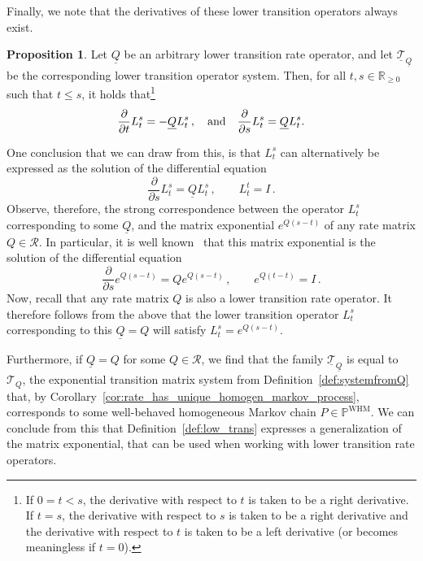 \documentclass[10pt,a4paper]{paper}
\theoremstyle{definition}
\newtheorem{proposition}[theorem]{Proposition}
\newcommand{\reals}{\mathbb{R}}
\newcommand{\realsnonneg}{\reals_{\geq 0}}
\newcommand{\processes}{\mathbb{P}}
\newcommand{\whmprocesses}{\processes^{\mathrm{WHM}}}
\newcommand{\lbound}{L}
\newcommand{\lrate}{\underline{Q}}
\begin{document}
Finally, we note that the derivatives of these lower transition operators always exist.

\begin{proposition}\label{prop:lower_transition_has_deriv}
Let $\lrate$ be an arbitrary lower transition rate operator, and let $\underline{\mathcal{T}}_{\lrate}$ be the corresponding lower transition operator system. Then, for all $t,s\in\realsnonneg$ such that $t\leq s$, it holds that\footnote{If $0=t<s$, the derivative with respect to $t$ is taken to be a right derivative. If $t=s$, the derivative with respect to $s$ is taken to be a right derivative and the derivative with respect to $t$ is taken to be a left derivative (or becomes meaningless if $t=0$).}
\begin{equation*}
\frac{\partial}{\partial t}\lbound_t^s=-\lrate\lbound_t^s\,,\quad\text{and}\quad\frac{\partial}{\partial s}\lbound_t^s=\lrate\lbound_t^s.\vspace{7pt}
\end{equation*}
\end{proposition}

One conclusion that we can draw from this, is that $L_t^s$ can alternatively be expressed as the solution of the differential equation
\begin{equation*}
\frac{\partial}{\partial s}L_t^s=\lrate L_t^s\,,\quad\quad L_t^t=I\,.
\end{equation*}
Observe, therefore, the strong correspondence between the operator $L_t^s$ corresponding to some $\lrate$, and the matrix exponential $e^{Q(s-t)}$ of any rate matrix $Q\in\mathcal{R}$. In particular, it is well known~\cite[Equation 4.4]{van2006study} that this matrix exponential is the solution of the differential equation
\begin{equation*}
\frac{\partial}{\partial s}e^{Q(s-t)}=Qe^{Q(s-t)}\,,\quad\quad e^{Q(t-t)}=I\,.
\end{equation*}
Now, recall that any rate matrix $Q$ is also a lower transition rate operator. It therefore follows from the above that the lower transition operator $L_t^s$ corresponding to this $\lrate=Q$ will satisfy $L_t^s=e^{Q(s-t)}$. 

Furthermore, if $\lrate=Q$ for some $Q\in\mathcal{R}$, we find that the family $\underline{\mathcal{T}}_{\lrate}$ is equal to $\mathcal{T}_Q$, the exponential transition matrix system from Definition~\ref{def:systemfromQ} that, by Corollary~\ref{cor:rate_has_unique_homogen_markov_process}, corresponds to some well-behaved homogeneous Markov chain $P\in\whmprocesses$. We can conclude from this that Definition~\ref{def:low_trans} expresses a generalization of the matrix exponential, that can be used when working with lower transition rate operators.
\end{document}
